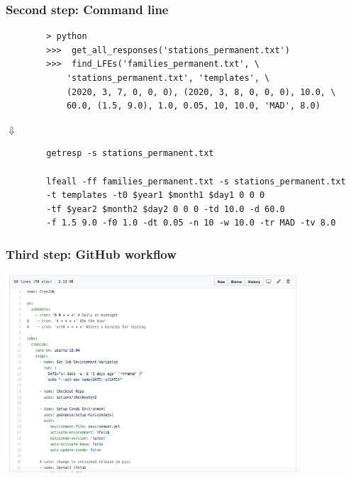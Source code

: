 \documentclass{beamer}
\begin{document}
	\begin{frame}[fragile]
		\frametitle{Second step: Command line}
		\begin{exampleblock}{}
		\scriptsize{
		\begin{lstlisting}
		> python
		>>>  get_all_responses('stations_permanent.txt')
		>>>  find_LFEs('families_permanent.txt', \
		    'stations_permanent.txt', 'templates', \
		    (2020, 3, 7, 0, 0, 0), (2020, 3, 8, 0, 0, 0), 10.0, \
		    60.0, (1.5, 9.0), 1.0, 0.05, 10, 10.0, 'MAD', 8.0)
		\end{lstlisting}
		}
		\end{exampleblock}

		\centering
		\Huge{
		$\Downarrow$
		}

		\begin{exampleblock}{}
		\scriptsize{
		\begin{verbatim}
		getresp -s stations_permanent.txt

		lfeall -ff families_permanent.txt -s stations_permanent.txt 
		-t templates -t0 $year1 $month1 $day1 0 0 0
		-tf $year2 $month2 $day2 0 0 0 -td 10.0 -d 60.0
		-f 1.5 9.0 -f0 1.0 -dt 0.05 -n 10 -w 10.0 -tr MAD -tv 8.0
		\end{verbatim}
		}
		\end{exampleblock}
	\end{frame}

	\begin{frame}
		\frametitle{Third step: GitHub workflow}
		\includegraphics[width=11cm]{cronjob.png}
	\end{frame}
\end{document}
